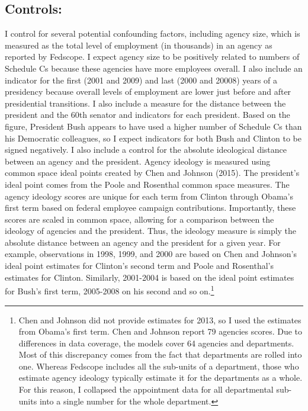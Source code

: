 \documentclass[12pt]{article}
\begin{document}
\subsection*{Controls:}
I control for several potential confounding factors, including agency size, which is measured as the total level of employment (in thousands) in an agency as reported by Fedscope. I expect agency size to be positively related to numbers of Schedule Cs because these agencies have more employees overall. I also include an indicator for the first (2001 and 2009) and last (2000 and 20008) years of a presidency because overall levels of employment are lower just before and after presidential transitions. I also include a measure for the distance between the president and the 60th senator and indicators for each president. Based on the figure, President Bush appears to have used a higher number of Schedule Cs than his Democratic colleagues, so I expect indicators for both Bush and Clinton to be signed negatively. I also include a control for the absolute ideological distance between an agency and the president. Agency ideology is measured using common space ideal points created by Chen and Johnson (2015). The president's ideal point comes from the Poole and Rosenthal common space measures. The agency ideology scores are unique for each term from Clinton through Obama's first term based on federal employee campaign contributions. Importantly, these scores are scaled in common space, allowing for a comparison between the ideology of agencies and the president. Thus, the ideology measure is simply the absolute distance between an agency and the president for a given year. For example, observations in 1998, 1999, and 2000 are based on Chen and Johnson's ideal point estimates for Clinton's second term and Poole and Rosenthal's estimates for Clinton. Similarly, 2001-2004 is based on the ideal point estimates for Bush's first term, 2005-2008 on his second and so on.\footnote{Chen and Johnson did not provide estimates for 2013, so I used the estimates from Obama's first term. Chen and Johnson report 79 agencies scores. Due to differences in data coverage, the models cover 64 agencies and departments. Most of this discrepancy comes from the fact that departments are rolled into one. Whereas Fedscope includes all the sub-units of a department, those who estimate agency ideology typically estimate it for the departments as a whole. For this reason, I collapsed the appointment data for all departmental sub-units into a single number for the whole department.}
\end{document}

